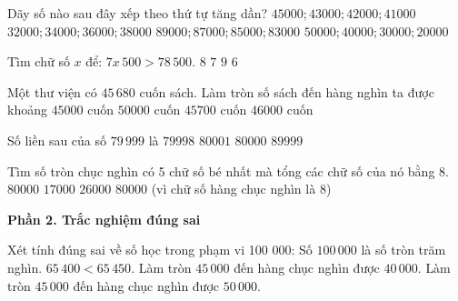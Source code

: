 \begin{ex} %
Dãy số nào sau đây xếp theo thứ tự tăng dần?
\choice
{$45000; 43000; 42000; 41000$}
{\True $32000; 34000; 36000; 38000$}
{$89000; 87000; 85000; 83000$}
{$50000; 40000; 30000; 20000$}
\end{ex}

\begin{ex} %
Tìm chữ số $x$ để: $7x\,500 > 78\,500$.
\choice
{$8$}
{$7$}
{\True $9$}
{$6$}
\end{ex}

\begin{ex} %
Một thư viện có $45\,680$ cuốn sách. Làm tròn số sách đến hàng nghìn ta được khoảng
\choice
{$45000$ cuốn}
{$50000$ cuốn}
{$45700$ cuốn}
{\True $46000$ cuốn}
\end{ex}

\begin{ex} %
Số liền sau của số $79\,999$ là
\choice
{$79998$}
{$80001$}
{\True $80000$}
{$89999$}
\end{ex}

\begin{ex} %
Tìm số tròn chục nghìn có 5 chữ số bé nhất mà tổng các chữ số của nó bằng 8.
\choice
{$80000$}
{$17000$}
{$26000$}
{\True $80000$ (vì chữ số hàng chục nghìn là $8$)}
\end{ex}

\textbf{Phần 2. Trắc nghiệm đúng sai}

\begin{ex} %
Xét tính đúng sai về số học trong phạm vi 100 000:
\choiceTF
{\True Số $100\,000$ là số tròn trăm nghìn.}
{\True $65\,400 < 65\,450$.}
{Làm tròn $45\,000$ đến hàng chục nghìn được $40\,000$.}
{\True Làm tròn $45\,000$ đến hàng chục nghìn được $50\,000$.}
\end{ex}

